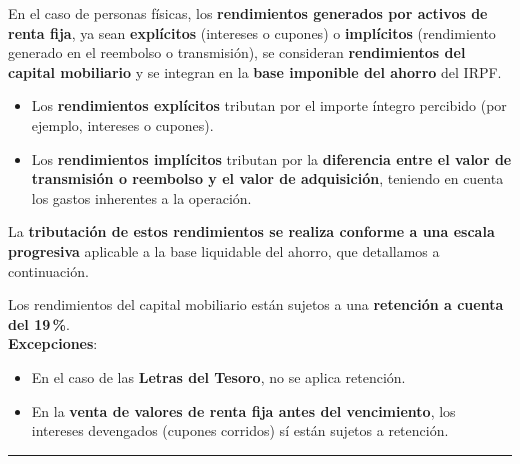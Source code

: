 \documentclass[
  letterpaper,
  DIV=11,
  numbers=noendperiod]{scrreprt}
\providecommand{\tightlist}{%
  \setlength{\itemsep}{0pt}\setlength{\parskip}{0pt}}\usepackage{longtable,booktabs,array}
\begin{document}
\begin{tcolorbox}
En el caso de personas físicas, los \textbf{rendimientos generados por
activos de renta fija}, ya sean \textbf{explícitos} (intereses o
cupones) o \textbf{implícitos} (rendimiento generado en el reembolso o
transmisión), se consideran \textbf{rendimientos del capital mobiliario}
y se integran en la \textbf{base imponible del ahorro} del IRPF.

\begin{itemize}
\tightlist
\item
  Los \textbf{rendimientos explícitos} tributan por el importe íntegro
  percibido (por ejemplo, intereses o cupones).
\item
  Los \textbf{rendimientos implícitos} tributan por la
  \textbf{diferencia entre el valor de transmisión o reembolso y el
  valor de adquisición}, teniendo en cuenta los gastos inherentes a la
  operación.
\end{itemize}

La \textbf{tributación de estos rendimientos se realiza conforme a una
escala progresiva} aplicable a la base liquidable del ahorro, que
detallamos a continuación.

\begin{tcolorbox}[enhanced jigsaw, toprule=.15mm, left=2mm, breakable, opacitybacktitle=0.6, toptitle=1mm, coltitle=black, arc=.35mm, leftrule=.75mm, bottomtitle=1mm, titlerule=0mm, title=\textcolor{quarto-callout-tip-color}{\faLightbulb}\hspace{0.5em}{Retención en origen}, rightrule=.15mm, opacityback=0, bottomrule=.15mm, colback=white, colframe=quarto-callout-tip-color-frame, colbacktitle=quarto-callout-tip-color!10!white]

Los rendimientos del capital mobiliario están sujetos a una
\textbf{retención a cuenta del 19\,\%}.\\
\textbf{Excepciones}:

\begin{itemize}
\tightlist
\item
  En el caso de las \textbf{Letras del Tesoro}, no se aplica retención.
\item
  En la \textbf{venta de valores de renta fija antes del vencimiento},
  los intereses devengados (cupones corridos) sí están sujetos a
  retención.
\end{itemize}

\end{tcolorbox}

\begin{center}\rule{0.5\linewidth}{0.5pt}\end{center}


\end{tcolorbox}
\end{document}
